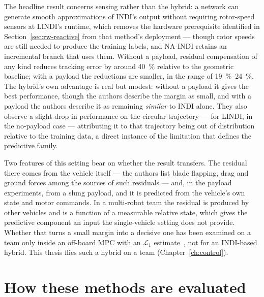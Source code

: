 The headline result concerns sensing rather than the hybrid: a network can generate smooth
approximations of INDI's output without requiring rotor-speed sensors at LINDI's runtime, which
removes the hardware prerequisite identified in Section~\ref{sec:rw-reactive} from that method's
deployment --- though rotor speeds are still needed to produce the training labels, and NA-INDI
retains an incremental branch that uses them. Without a payload, residual compensation of any kind
reduces tracking error by around \SI{40}{\percent} relative to the geometric baseline; with a
payload the reductions are smaller, in the range of \SIrange{19}{24}{\percent}. The hybrid's own
advantage is real but modest: without a payload it gives the best performance, though the authors
describe the margin as small, and with a payload the authors describe it as remaining
\emph{similar} to INDI alone. They also observe a slight drop in performance on the circular
trajectory --- for LINDI, in the no-payload case --- attributing it to that trajectory being out of
distribution relative to the training data, a direct instance of the limitation that defines the
predictive family.

Two features of this setting bear on whether the result transfers. The residual there comes from
the vehicle itself --- the authors list blade flapping, drag and ground forces among the sources of
such residuals --- and, in the payload experiments, from a slung payload, and it is predicted from
the vehicle's own state and motor commands. In a multi-robot team the residual is produced by other
vehicles and is a function of a measurable relative state, which gives the predictive component an
input the single-vehicle setting does not provide. Whether that turns a small margin into a
decisive one has been examined on a team only inside an off-board MPC with an $\mathcal{L}_1$
estimate~\cite{hsieh2025onlineadaptation}, not for an INDI-based hybrid. This thesis flies such a
hybrid on a team (Chapter~\ref{ch:control}).

\section{How these methods are evaluated}
\label{sec:rw-eval}

